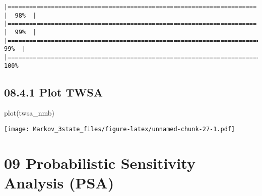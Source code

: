 \documentclass[
]{article}
\newenvironment{Shaded}{\begin{snugshade}}{\end{snugshade}}
\newcommand{\FunctionTok}[1]{\textcolor[rgb]{0.00,0.00,0.00}{#1}}
\newcommand{\NormalTok}[1]{#1}
\begin{document}
\begin{verbatim}
|===================================================================== |  98%  |                                                                              |===================================================================== |  99%  |                                                                              |======================================================================|  99%  |                                                                              |======================================================================| 100%
\end{verbatim}

\hypertarget{plot-twsa}{%
\subsection{08.4.1 Plot TWSA}\label{plot-twsa}}

\begin{Shaded}
\begin{Highlighting}[]
\FunctionTok{plot}\NormalTok{(twsa\_nmb)}
\end{Highlighting}
\end{Shaded}

\texttt{[image: Markov\_3state\_files/figure-latex/unnamed-chunk-27-1.pdf]}

\hypertarget{probabilistic-sensitivity-analysis-psa}{%
\section{09 Probabilistic Sensitivity Analysis
(PSA)}\label{probabilistic-sensitivity-analysis-psa}}
\end{document}
